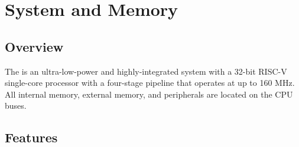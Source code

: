 \documentclass[main\_\_EN.tex]{subfiles}
\begin{document}

\ifglobal
\else
    {\let\clearpage\relax \listoftodos}
    \tableofcontents
\fi



\hypertarget{sysmem}{}
\chapter{System and Memory} 
\label{mod:sysmem}

\section{Overview}

The \chipname{} is an ultra-low-power and highly-integrated system with a 32-bit RISC-V single-core processor with a four-stage pipeline that operates at up to 160 MHz. All internal memory, external memory, and peripherals are located on the CPU buses.

\section{Features}
\end{document}
